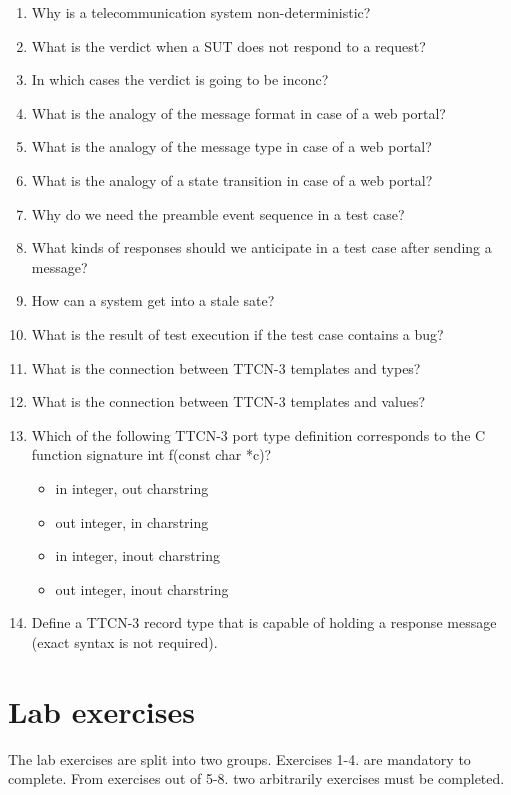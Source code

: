 \documentclass[a4paper]{article}
\begin{document}
\begin{enumerate}

    \item  Why is a telecommunication system non-deterministic?
    \item  What is the verdict when a SUT does not respond to a request?
    \item  In which cases the verdict is going to be inconc?
    \item  What is the analogy of the message format in case of a web portal?
    \item  What is the analogy of the message type in case of a web portal?
    \item  What is the analogy of a state transition in case of a web portal?
    \item  Why do we need the preamble event sequence in a test case?
    \item  What kinds of responses should we anticipate in a test case after sending a message?
    \item  How can a system get into a stale sate?
    \item  What is the result of test execution if the test case contains a bug?
    \item  What is the connection between TTCN-3 templates and types?
    \item  What is the connection between TTCN-3 templates and values?
    \item Which of the following TTCN-3 port type definition corresponds to the C function signature int f(const char
          *c)?
          \begin{itemize}
              \item in integer, out charstring
              \item out integer, in charstring
              \item in integer, inout charstring
              \item out integer, inout charstring
          \end{itemize}
    \item  Define a TTCN-3 record type that is capable of holding a response message (exact syntax is not required).
\end{enumerate}

\section{Lab exercises}

The lab exercises are split into two groups. Exercises 1-4. are mandatory to complete. From exercises out of 5-8. two
arbitrarily exercises must be completed.
\end{document}
